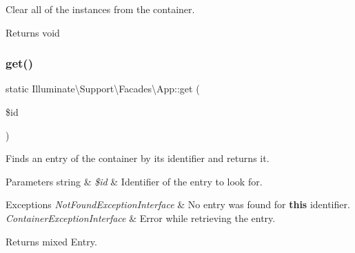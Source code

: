 Clear all of the instances from the container.

\begin{DoxyReturn}{Returns}
void 
\end{DoxyReturn}
\mbox{\label{class_illuminate_1_1_support_1_1_facades_1_1_app_a042054c3892563f7f0b31cb9e1c9bb76}} 
\subsubsection{\texorpdfstring{get()}{get()}}
{\footnotesize\ttfamily static Illuminate\textbackslash{}\+Support\textbackslash{}\+Facades\textbackslash{}\+App\+::get (\begin{DoxyParamCaption}\item[{}]{\$id }\end{DoxyParamCaption})\hspace{0.3cm}{\ttfamily [static]}}

Finds an entry of the container by its identifier and returns it.


\begin{DoxyParams}[1]{Parameters}
string & {\em \$id} & Identifier of the entry to look for. \\
\hline
\end{DoxyParams}

\begin{DoxyExceptions}{Exceptions}
{\em Not\+Found\+Exception\+Interface} & No entry was found for {\bfseries this} identifier. \\
\hline
{\em Container\+Exception\+Interface} & Error while retrieving the entry. \\
\hline
\end{DoxyExceptions}
\begin{DoxyReturn}{Returns}
mixed Entry. 
\end{DoxyReturn}
\mbox{\label{class_illuminate_1_1_support_1_1_facades_1_1_app_a332b40e237f5eed64e3b5c26a9198922}} 
